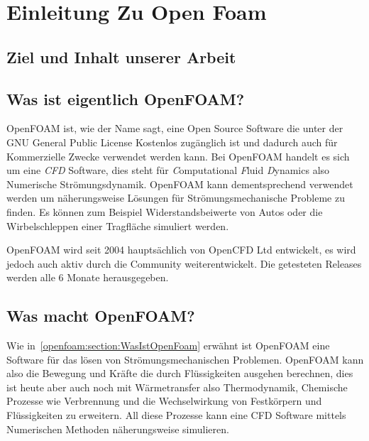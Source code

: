 %
%
%
%
\section{Einleitung Zu Open Foam\label{openfoam:section:Einleitung}}
\subsection{Ziel und Inhalt unserer Arbeit}

\subsection{Was ist eigentlich OpenFOAM?\label{openfoam:section:WasIstOpenFoam}}
OpenFOAM ist, wie der Name sagt, eine Open Source Software die unter der GNU
General Public License Kostenlos zugänglich ist und dadurch auch für Kommerzielle Zwecke 
verwendet werden kann. 
Bei OpenFOAM handelt es sich um eine \emph{CFD} Software, 
dies steht für \emph{C}omputational \emph{F}luid \emph{D}ynamics also Numerische Strömungsdynamik.
OpenFOAM kann dementsprechend verwendet werden um näherungsweise Lösungen für 
Strömungsmechanische Probleme zu finden.
Es können zum Beispiel Widerstandsbeiwerte von Autos oder die Wirbelschleppen einer Tragfläche simuliert werden.

OpenFOAM wird seit 2004 hauptsächlich von OpenCFD Ltd entwickelt, es wird jedoch auch aktiv durch die Community weiterentwickelt.
Die getesteten Releases werden alle 6 Monate herausgegeben.~\cite{openfoam:greenshieldsweller2022}
\subsection{Was macht OpenFOAM?}
Wie in~\ref{openfoam:section:WasIstOpenFoam} erwähnt ist OpenFOAM eine Software für das lösen von Strömungsmechanischen Problemen.
OpenFOAM kann also die Bewegung und Kräfte die durch Flüssigkeiten ausgehen berechnen, 
dies ist heute aber auch noch mit Wärmetransfer also Thermodynamik, Chemische Prozesse wie Verbrennung
und die Wechselwirkung von Festkörpern und Flüssigkeiten zu erweitern. 
All diese Prozesse kann eine CFD Software mittels Numerischen Methoden näherungsweise simulieren. 
~\cite{openfoam:greenshieldsweller2022} 
